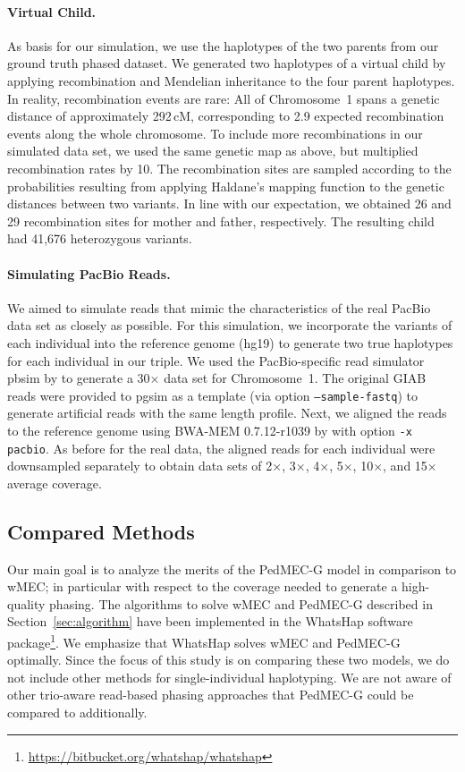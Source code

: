 \paragraph{Virtual Child.}
As basis for our simulation, we use the haplotypes of the two parents from our ground truth phased dataset.
We generated two haplotypes of a virtual child by applying recombination and Mendelian inheritance to the four parent haplotypes.
In reality, recombination events are rare: All of Chromosome~1 spans a genetic distance of approximately 292\,cM, corresponding to 2.9 expected recombination events along the whole chromosome.
To include more recombinations in our simulated data set, we used the same genetic map as above, but multiplied recombination rates by 10.
The recombination sites are sampled according to the probabilities resulting from applying Haldane's mapping function to the genetic distances between two variants.
In line with our expectation, we obtained 26 and 29 recombination sites for mother and father, respectively. 
The resulting child had 41,676 heterozygous variants.

\paragraph{Simulating PacBio Reads.}
We aimed to simulate reads that mimic the characteristics of the real PacBio data set as closely as possible.
For this simulation, we incorporate the variants of each individual into the reference genome (hg19) to generate two true haplotypes for each individual in our triple.
We used the PacBio-specific read simulator pbsim by \cite{pbsim} to generate a 30$\times$ data set for Chromosome~1.
The original GIAB reads were provided to pgsim as a template (via option \texttt{--sample-fastq}) to generate artificial reads with the same length profile.
Next, we aligned the reads to the reference genome using BWA-MEM 0.7.12-r1039 by \cite{bwa} with option \texttt{-x pacbio}.
As before for the real data, the aligned reads for each individual were downsampled separately to obtain data sets of 2$\times$, 3$\times$, 4$\times$, 5$\times$, 10$\times$, and 15$\times$ average coverage.

\subsection{Compared Methods}
Our main goal is to analyze the merits of the PedMEC-G model in comparison to wMEC; in particular with respect to the coverage needed to generate a high-quality phasing.
The algorithms to solve wMEC and PedMEC-G described in Section~\ref{sec:algorithm} have been implemented in the WhatsHap software package\footnote{\scriptsize{\url{https://bitbucket.org/whatshap/whatshap}}}.
We emphasize that WhatsHap solves wMEC and PedMEC-G optimally.
Since the focus of this study is on comparing these two models, we do not include other methods for single-individual haplotyping.
We are not aware of other trio-aware read-based phasing approaches that PedMEC-G could be compared to additionally.

